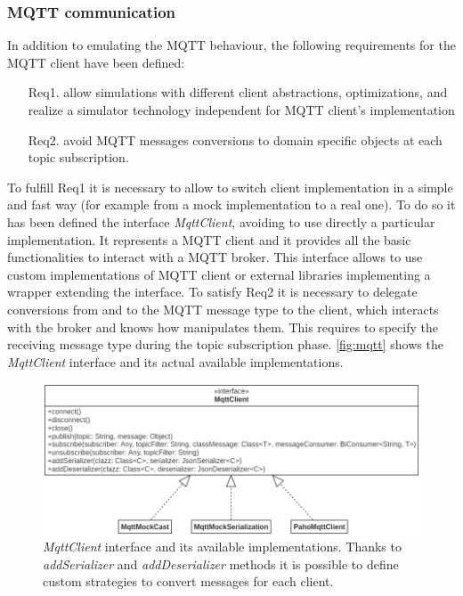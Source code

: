 \subsubsection{MQTT communication}
In addition to emulating the MQTT behaviour, the following requirements for the MQTT client have been defined:
\begin{itemize}
    \item[Req1.] allow simulations with different client abstractions, optimizations, and realize a simulator technology independent for MQTT client's implementation 
    \item[Req2.] avoid MQTT messages conversions to domain specific objects at each topic \mbox{subscription}.
\end{itemize}
To fulfill Req1 it is necessary to allow to switch client implementation in a simple and fast way (for example from a mock implementation to a real one).
To do so it has been defined the interface \mbox{\textit{MqttClient}}, avoiding to use directly a particular implementation.
It represents a MQTT client and it provides all the basic functionalities to interact with a MQTT broker. 
This interface allows to use custom implementations of MQTT client or external libraries implementing a wrapper extending the interface.
% 
To satisfy Req2 it is necessary to delegate conversions from and to the MQTT message type to the client, which interacts with the broker and knows how manipulates them.
% 
This requires to specify the receiving message type during the topic subscription phase.
% 
\autoref{fig:mqtt} shows the \mbox{\textit{MqttClient}} interface and its actual available implementations.
\begin{figure}[h]
    \centering
    \includegraphics[width=\textwidth]{figures/mqttClient.png}
    \caption[\textit{MqttClient} interface and its available implementations]{\textit{MqttClient} interface and its available implementations. Thanks to \mbox{\textit{addSerializer}} and \mbox{\textit{addDeserializer}} methods it is possible to define custom strategies to convert messages for each client.}
    \label{fig:mqtt}
\end{figure}

